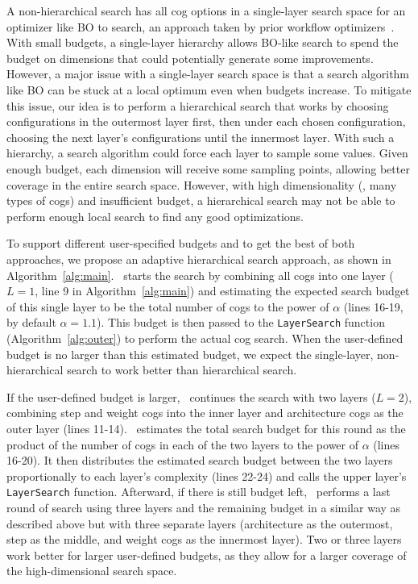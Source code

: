 A non-hierarchical search has all cog options in a single-layer search space for an optimizer like BO to search, an approach taken by prior workflow optimizers~\cite{dspy-2-2024,gptswarm}.
With small budgets, a single-layer hierarchy allows BO-like search to spend the budget on dimensions that could potentially generate some improvements.
However, a major issue with a single-layer search space is that a search algorithm like BO can be stuck at a local optimum even when budgets increase.
To mitigate this issue, our idea is to perform a hierarchical search that works by choosing configurations in the outermost layer first, then under each chosen configuration, choosing the next layer's configurations until the innermost layer. 
With such a hierarchy, a search algorithm could force each layer to sample some values. Given enough budget, each dimension will receive some sampling points, allowing better coverage in the entire search space. However, with high dimensionality (\ie, many types of cogs) and insufficient budget, a hierarchical search may not be able to perform enough local search to find any good optimizations.

To support different user-specified budgets and to get the best of both approaches, we propose an adaptive hierarchical search approach, as shown in Algorithm~\ref{alg:main}.
\search\ starts the search by combining all cogs into one layer ($L=1$, line 9 in Algorithm~\ref{alg:main}) and estimating the expected search budget of this single layer to be the total number of cogs to the power of $\alpha$ (lines 16-19, by default $\alpha = 1.1$). This budget is then passed to the \texttt{LayerSearch} function (Algorithm~\ref{alg:outer}) to perform the actual cog search. When the user-defined budget is no larger than this estimated budget, we expect the single-layer, non-hierarchical search to work better than hierarchical search.

If the user-defined budget is larger, \search\ continues the search with two layers ($L=2$), combining step and weight cogs into the inner layer and architecture cogs as the outer layer (lines 11-14).
\search\ estimates the total search budget for this round as the product of the number of cogs in each of the two layers to the power of $\alpha$ (lines 16-20). It then distributes the estimated search budget between the two layers proportionally to each layer's complexity (lines 22-24) and calls the upper layer's \texttt{LayerSearch} function. Afterward, if there is still budget left, \search\ performs a last round of search using three layers and the remaining budget in a similar way as described above but with three separate layers (architecture as the outermost, step as the middle, and weight cogs as the innermost layer). Two or three layers work better for larger user-defined budgets, as they allow for a larger coverage of the high-dimensional search space.

